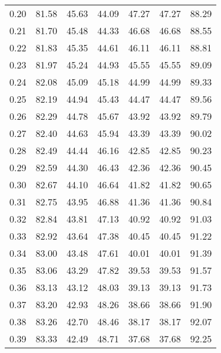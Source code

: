 \begin{tabular}{|c|c|c|c|c|c|c|}
      0.20 &     81.58 &     45.63 &      44.09 &   47.27 &      47.27 &         88.29 \\
      0.21 &     81.70 &     45.48 &      44.33 &   46.68 &      46.68 &         88.55 \\
      0.22 &     81.83 &     45.35 &      44.61 &   46.11 &      46.11 &         88.81 \\
      0.23 &     81.97 &     45.24 &      44.93 &   45.55 &      45.55 &         89.09 \\
      0.24 &     82.08 &     45.09 &      45.18 &   44.99 &      44.99 &         89.33 \\
      0.25 &     82.19 &     44.94 &      45.43 &   44.47 &      44.47 &         89.56 \\
      0.26 &     82.29 &     44.78 &      45.67 &   43.92 &      43.92 &         89.79 \\
      0.27 &     82.40 &     44.63 &      45.94 &   43.39 &      43.39 &         90.02 \\
      0.28 &     82.49 &     44.44 &      46.16 &   42.85 &      42.85 &         90.23 \\
      0.29 &     82.59 &     44.30 &      46.43 &   42.36 &      42.36 &         90.45 \\
      0.30 &     82.67 &     44.10 &      46.64 &   41.82 &      41.82 &         90.65 \\
      0.31 &     82.75 &     43.95 &      46.88 &   41.36 &      41.36 &         90.84 \\
      0.32 &     82.84 &     43.81 &      47.13 &   40.92 &      40.92 &         91.03 \\
      0.33 &     82.92 &     43.64 &      47.38 &   40.45 &      40.45 &         91.22 \\
      0.34 &     83.00 &     43.48 &      47.61 &   40.01 &      40.01 &         91.39 \\
      0.35 &     83.06 &     43.29 &      47.82 &   39.53 &      39.53 &         91.57 \\
      0.36 &     83.13 &     43.12 &      48.03 &   39.13 &      39.13 &         91.73 \\
      0.37 &     83.20 &     42.93 &      48.26 &   38.66 &      38.66 &         91.90 \\
      0.38 &     83.26 &     42.70 &      48.46 &   38.17 &      38.17 &         92.07 \\
      0.39 &     83.33 &     42.49 &      48.71 &   37.68 &      37.68 &         92.25 \\

\end{tabular}
